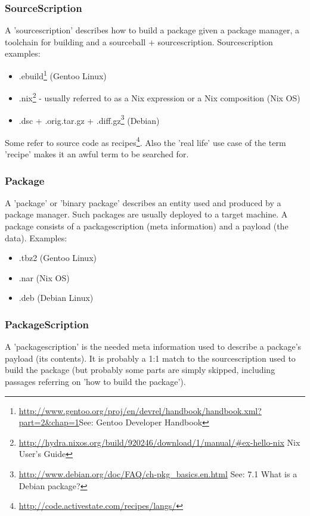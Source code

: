 \documentclass[a4paper,10pt]{article}
\begin{document}
\subsubsection*{SourceScription}
A 'sourcescription' describes how to build a package given a package manager, a toolchain for building and a sourceball + sourcescription. Sourcescription examples:
\begin{itemize}
 \item .ebuild\footnote{\url{http://www.gentoo.org/proj/en/devrel/handbook/handbook.xml?part=2&chap=1}See: Gentoo Developer Handbook} (Gentoo Linux)
 \item .nix\footnote{\url{http://hydra.nixos.org/build/920246/download/1/manual/\#ex-hello-nix} Nix User's Guide} - usually referred to as a Nix expression or a Nix composition (Nix OS)
 \item .dsc + .orig.tar.gz + .diff.gz\footnote{\url{http://www.debian.org/doc/FAQ/ch-pkg_basics.en.html} See: 7.1 What is a Debian package?} (Debian)
\end{itemize}
Some refer to source code as recipes\footnote{\url{http://code.activestate.com/recipes/langs/}}. Also the 'real life' use case of the term 'recipe' makes it an awful term to be searched for.

\subsubsection*{Package}
A 'package' or 'binary package' describes an entity used and produced by a package manager. Such packages are usually deployed to a target machine. A package consists of a packagescription (meta information) and a payload (the data). Examples:
\begin{itemize}
\item .tbz2 (Gentoo Linux)
\item .nar (Nix OS)
\item .deb (Debian Linux)
\end{itemize}

\subsubsection*{PackageScription}
A 'packagescription' is the needed meta information used to describe a package's payload (its contents). It is probably a 1:1 match to the sourcescription used to build the package (but probably some parts are simply skipped, including passages referring on 'how to build the package').
\end{document}
